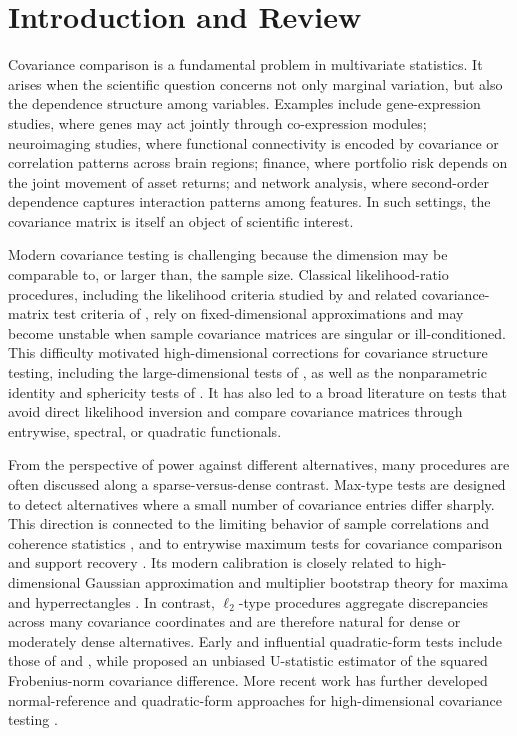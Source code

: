 \documentclass[
  12pt]{article}
\theoremstyle{plain}
\theoremstyle{definition}
\theoremstyle{remark}
\begin{document}
\newpage
{} %

\section{Introduction and Review}\label{sec:intro}

Covariance comparison is a fundamental problem in multivariate statistics.  It
arises when the scientific question concerns not only marginal variation, but
also the dependence structure among variables.  Examples include
gene-expression studies, where genes may act jointly through co-expression
modules; neuroimaging studies, where functional connectivity is encoded by
covariance or correlation patterns across brain regions; finance, where
portfolio risk depends on the joint movement of asset returns; and network
analysis, where second-order dependence captures interaction patterns among
features.  In such settings, the covariance matrix is itself an object of
scientific interest.

Modern covariance testing is challenging because the dimension may be
comparable to, or larger than, the sample size.  Classical likelihood-ratio
procedures, including the likelihood criteria studied by
\citet{box_general_1949} and related covariance-matrix test criteria of
\citet{nagao_some_1973}, rely on fixed-dimensional approximations and may
become unstable when sample covariance matrices are singular or
ill-conditioned.  This difficulty motivated high-dimensional corrections for
covariance structure testing, including the large-dimensional tests of
\citet{ledoit_some_2002}, as well as the nonparametric identity and sphericity
tests of \citet{chen_tests_2010}.  It has also led to
a broad literature on tests that avoid direct likelihood inversion and compare
covariance matrices through entrywise, spectral, or quadratic functionals.

From the perspective of power against different alternatives, many procedures
are often discussed along a sparse-versus-dense contrast.  Max-type tests are
designed to detect alternatives where a small number of covariance entries
differ sharply.  This direction is connected to
the limiting behavior of sample correlations and coherence statistics
\citep{cai_limiting_2011}, and to entrywise maximum tests for covariance
comparison and support recovery
\citep{cai_two-sample_2013,chang_comparing_2017}.  Its modern calibration is
closely related to high-dimensional Gaussian approximation and multiplier
bootstrap theory for maxima and hyperrectangles
\citep{chernozhukov_gaussian_2013,chernozhukov_central_2017,
chernozhukov_high-dimensional_2023}.  In contrast, \(\ell_2\)-type procedures
aggregate discrepancies across many covariance coordinates and are therefore
natural for dense or moderately dense alternatives.  Early and influential
quadratic-form tests include those of \citet{schott_test_2007} and
\citet{srivastava_testing_2010}, while \citet{li_two_2012} proposed an
unbiased U-statistic estimator of the squared Frobenius-norm covariance
difference.  More recent work has further developed normal-reference and
quadratic-form approaches for high-dimensional covariance testing
\citep{wang_two-sample_2024}.
\end{document}
